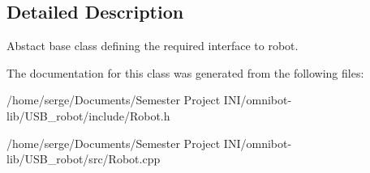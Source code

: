 \subsection{Detailed Description}
Abstact base class defining the required interface to robot. 

The documentation for this class was generated from the following files\+:\begin{DoxyCompactItemize}
\item 
/home/serge/\+Documents/\+Semester Project I\+N\+I/omnibot-\/lib/\+U\+S\+B\+\_\+robot/include/Robot.\+h\item 
/home/serge/\+Documents/\+Semester Project I\+N\+I/omnibot-\/lib/\+U\+S\+B\+\_\+robot/src/Robot.\+cpp\end{DoxyCompactItemize}
